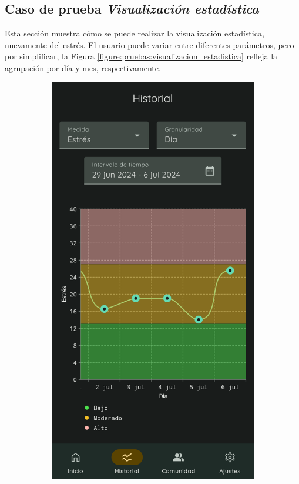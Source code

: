             \clearpage  %
        \subsection*{Caso de prueba \textit{Visualización estadística}} 

            Esta sección muestra cómo se puede realizar la visualización estadística, nuevamente del estrés. El usuario puede variar entre diferentes parámetros, pero por simplificar, la Figura \ref{figure:pruebas:visualizacion_estadistica} refleja la agrupación por día y mes, respectivamente.

            \begin{figure}[htbp]
                \centering
                \begin{subfigure}[c]{0.4\textwidth}
                    \centering
                    \includegraphics[width=1\textwidth]{figures/pruebas/visualizacion_estadistica/Grafica estres dia.png}

\end{subfigure}
\end{figure}
